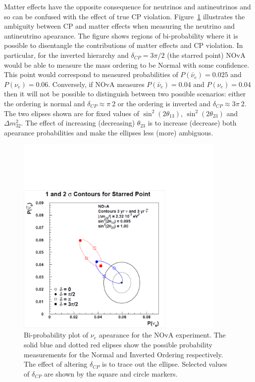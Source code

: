 Matter effects have the opposite consequence for neutrinos and
antineutrinos and so can be confused with the effect of true CP
violation. Figure~\ref{fig:BiProb} illustrates the ambiguity between
CP and matter effects when measuring the neutrino and antineutrino
apearance. 
The figure shows regions of bi-probability where it is possible to
disentangle the contributions of matter effects and CP violation. In
particular, for the inverted hierarchy and $\delta_{CP} = 3\pi /2$
(the starred point) NOvA would be able to measure the mass ordering to 
be Normal with some confidence. This point would correspond to
measured probabilities of $P(\bar{\nu}_e) = 0.025$ and $P(\nu_e) =
0.06$. 
Conversely, if NOvA measures $P(\bar{\nu}_e) = 0.04$ and $P(\nu_e) =
0.04$ then it will not be possible to distinguish between two possible
scenarios: either the ordering is normal and $\delta_{CP} \approx \pi
\ 2$ or the ordering is inverted and $\delta_{CP} \approx 3 \pi
\ 2$.
The two elipses shown are for fixed values of 
$\sin^2\left( 2\theta_{13} \right)$, $\sin^2\left( 2\theta_{23}
\right)$ and $\Delta m_{32}^2$. The effect of increasing (decreasing)
$\theta_{23}$ is to increase (decrease) both apearance probabilities
and make the ellipses less (more) ambiguous.

\begin{figure}
  \centering
  \includegraphics[width=0.9\textwidth]{../../img/Theory/09_Bi-Probability_Plots.pdf}
  \caption{
    Bi-probability plot of $\nu_e$ apearance for the NOvA experiment. 
    The solid blue and dotted red elipses show the possible
    probability measurements for the Normal and Inverted Ordering
    respectively. The effect of altering $\delta_{CP}$ is to trace out the
    ellipse. Selected values of $\delta_{CP}$ are shown by the square
    and circle markers.
  } 
  \label{fig:BiProb}
\end{figure}